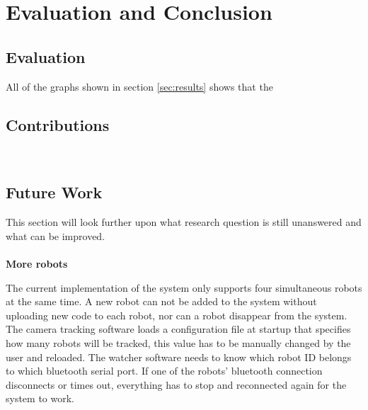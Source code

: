 \chapter{Evaluation and Conclusion}
\label{cha:evaluationAndConclusion}




\section{Evaluation}
\label{sec:Evaluation}
All of the graphs shown in section \ref{sec:results} shows that the 





\section{Contributions}~\label{cont}
\label{sec:Contributions}





\section{Future Work}
\label{sec:futureWork}

This section will look further upon what research question is still unanswered and what can be improved.\\\\
\textbf{More robots}

The current implementation of the system only supports four simultaneous robots at the same time. A new robot can not be added to the system without uploading new code to each robot, nor can a robot disappear from the system. The camera tracking software loads a configuration file at startup that specifies how many robots will be tracked, this value has to be manually changed by the user and reloaded.
The watcher software needs to know which robot ID belongs to which bluetooth serial port. If one of the robots' bluetooth connection disconnects or times out, everything has to stop and reconnected again for the system to work.

